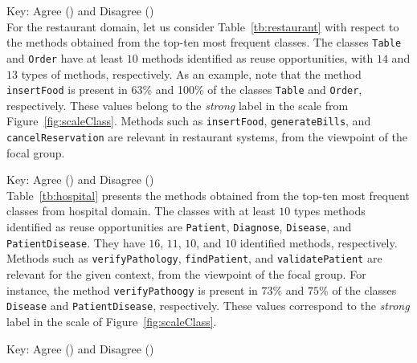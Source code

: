 

\newpage
\noindent
Key: Agree (\checkmark) and Disagree (\xmark)\\

For the restaurant domain, let us consider Table~\ref{tb:restaurant} with respect to the methods obtained from the top-ten most frequent classes. The classes \texttt{Table} and \texttt{Order} have at least $10$ methods identified as reuse opportunities, with $14$ and $13$ types of methods, respectively. As an example, note that the method \texttt{insertFood} is present in 63\% and 100\% of the classes \texttt{Table} and \texttt{Order}, respectively. These values belong to the \textit{strong} label in the scale from Figure~\ref{fig:scaleClass}. Methods such as \texttt{insertFood}, \texttt{generateBills}, and \texttt{cancelReservation} are relevant in restaurant systems, from the viewpoint of the focal group.



\newpage
\noindent
Key: Agree (\checkmark) and Disagree (\xmark)\\





Table~\ref{tb:hospital} presents the methods obtained from the top-ten most frequent classes from  hospital domain. The classes with at least $10$ types methods identified as reuse opportunities are \texttt{Patient}, \texttt{Diagnose}, \texttt{Disease}, and \texttt{PatientDisease}. They have $16$, $11$, $10$, and $10$ identified methods, respectively. Methods such as \texttt{verifyPathology}, \texttt{findPatient}, and \texttt{validatePatient} are relevant for the given context, from the viewpoint of the focal group. For instance, the method \texttt{verifyPathoogy} is present in $73\%$ and $75\%$ of the classes \texttt{Disease} and \texttt{PatientDisease}, respectively. These values correspond to the \textit{strong} label in the scale of Figure~\ref{fig:scaleClass}.



\newpage

\begin{adjustwidth}{0.5cm}{0cm}
Key: Agree (\checkmark) and Disagree (\xmark)\\
\end{adjustwidth}



